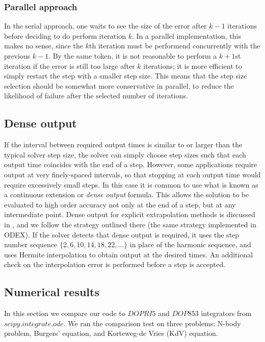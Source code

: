 \documentclass[12pt]{article}
\begin{document}
\subsubsection{Parallel approach}
In the serial approach, one waits to see the size of the error
after $k-1$ iterations before deciding to do perform iteration $k$.
In a parallel implementation, this makes no sense, since the $k$th
iteration must be performend concurrently with the previous $k-1$.
By the same token, it is not reasonable to perform a $k+1$st
iteration if the error is still too large after $k$ iterations;
it is more efficient to simply restart the step with a smaller
step size.
This means that the step size selection should be somewhat more
conservative in parallel, to reduce the likelihood of failure
after the selected number of iterations.


\subsection{Dense output}
If the interval between required output times is similar to or larger
than the typical solver step size, the solver can simply choose step
sizes such that each output time coincides with the end of a step.
However, some applications require output at very finely-spaced intervals,
so that stopping at each output time would require excessively small steps.
In this case it is common to use what is known as a continuous extension
or {\em dense output} formula.  This allows the solution to be evaluated
to high order accuracy not only at the end of a step, but at any intermediate point.
Dense output for explicit extrapolation methods is discussed in \cite[pp. 237-241]{Hairer1993},
and we follow the strategy outlined there (the same strategy implemented in ODEX).
If the solver detects that dense output is required, it uses the step number sequence
$\{2, 6, 10, 14, 18, 22, \dots\}$ in place of the harmonic sequence, and uses
Hermite interpolation to obtain output at the desired times.  An additional check
on the interpolation error is performed before a step is accepted.


\subsection{Numerical results}
In this section we compare our code to $DOPRI5$ and $DOP853$ integrators from
$scipy.integrate.ode$. We ran the comparison test on three problems: N-body
problem, Burgers' equation, and Korteweg-de Vries (KdV) equation. 
\end{document}
